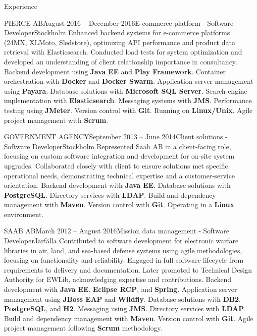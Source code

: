 \documentclass{resume}
\begin{document}
\begin{rSection}{Experience}
    \begin{rSubsection}{PIERCE AB}{August 2016 -- December 2016}{E-commerce platform - Software Developer}{Stockholm}
      \bItem Enhanced backend systems for e-commerce platforms (24MX, XLMoto, Sledstore), optimizing API performance and product data retrieval with Elasticsearch. Conducted load tests for system optimization and developed an understanding of client relationship importance in consultancy.
      \techItem Backend development using \textbf{Java EE} and \textbf{Play Framework}. Container orchestration with \textbf{Docker} and \textbf{Docker Swarm}. Application server management using \textbf{Payara}. Database solutions with \textbf{Microsoft SQL Server}. Search engine implementation with \textbf{Elasticsearch}. Messaging systems with \textbf{JMS}. Performance testing using \textbf{JMeter}. Version control with \textbf{Git}. Running on \textbf{Linux/Unix}. Agile project management with \textbf{Scrum}.
    \end{rSubsection}

    \begin{rSubsection}{GOVERNMENT AGENCY}{September 2013 -- June 2014}{Client solutions - Software Developer}{Stockholm}
      \bItem Represented Saab AB in a client-facing role, focusing on custom software integration and development for on-site system upgrades. Collaborated closely with client to ensure solutions met specific operational needs, demonstrating technical expertise and a customer-service orientation.
      \techItem Backend development with \textbf{Java EE}. Database solutions with \textbf{PostgreSQL}. Directory services with \textbf{LDAP}. Build and dependency management with \textbf{Maven}. Version control with \textbf{Git}. Operating in a \textbf{Linux} environment.
    \end{rSubsection}
    \pagebreak

    \begin{rSubsection}{SAAB AB}{March 2012 -- August 2016}{Mission data management - Software Developer}{Järfälla}
      \bItem Contributed to software development for electronic warfare libraries in air, land, and sea-based defense systems using agile methodologies, focusing on functionality and reliability. Engaged in full software lifecycle from requirements to delivery and documentation. Later promoted to Technical Design Authority for EWLib, acknowledging expertise and contributions.
      \techItem Backend development with \textbf{Java EE}, \textbf{Eclipse RCP}, and \textbf{Spring}. Application server management using \textbf{JBoss EAP} and \textbf{Wildfly}. Database solutions with \textbf{DB2}, \textbf{PostgreSQL}, and \textbf{H2}. Messaging using \textbf{JMS}. Directory services with \textbf{LDAP}. Build and dependency management with \textbf{Maven}. Version control with \textbf{Git}. Agile project management following \textbf{Scrum} methodology.
    \end{rSubsection}


\end{rSection}
\end{document}
